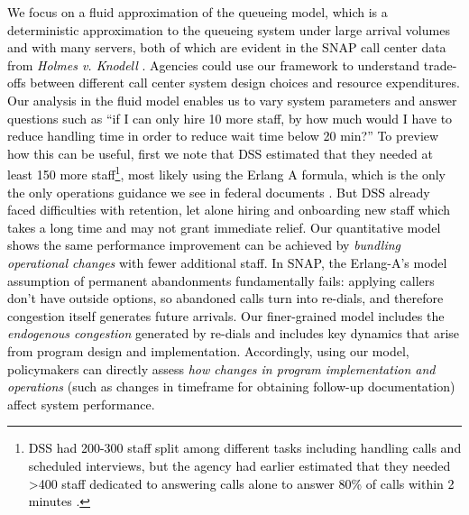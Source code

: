 \documentclass[manuscript,screen,authorversion]{acmart}
\newcommand{\rev}[1]{\textcolor{black}{#1}}
\begin{document}
\rev{We focus on a fluid approximation of the queueing model, which is a deterministic approximation to the queueing system under large arrival volumes and with many servers, both of which are evident in the  SNAP call center data from \emph{Holmes v. Knodell} \citep{holmesKnodellPlaintiffsMSJ2024}. Agencies could use our framework to understand trade-offs between different call center system design choices and resource expenditures. Our analysis in the fluid model enables us to vary system parameters and answer questions such as  ``if I can only hire 10 more staff, by how much would I have to reduce handling time in order to reduce wait time below 20 min?'' To preview how this can be useful, first we note that DSS estimated that they needed at least 150 more staff\footnote{\rev{DSS had 200-300 staff split among different tasks including handling calls and scheduled interviews, but the agency had earlier estimated that they needed >400 staff dedicated to answering calls alone to answer 80\% of calls within 2 minutes \citep{holmesKnodellPlaintiffsMSJ2024}.}}, most likely using the Erlang A formula, which is the only the only operations guidance we see in federal documents \citep{fns}. But DSS already faced difficulties with retention, let alone hiring and onboarding new staff which takes a long time and may not grant immediate relief. Our quantitative model shows the same performance improvement can be achieved by \textit{bundling operational changes} with fewer additional staff. In SNAP, the Erlang-A's model assumption of permanent abandonments fundamentally fails: applying callers don't have outside options, so abandoned calls turn into re-dials, and therefore congestion itself generates future arrivals. Our finer-grained model includes the \textit{endogenous congestion} generated by re-dials and includes key dynamics that arise from program design and implementation. Accordingly, using our model, policymakers can directly assess \textit{how changes in program implementation and operations} (such as changes in timeframe for obtaining follow-up documentation) affect system performance. }
\end{document}
